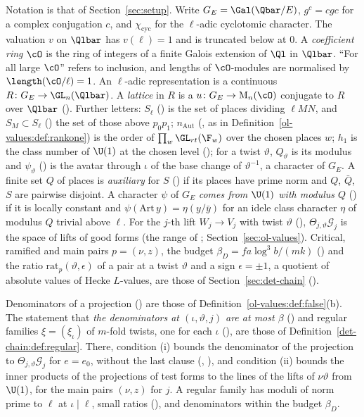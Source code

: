 Notation is that of Section~\ref{sec:setup}. Write $G_E=\Gal(\Qbar/E)$, $g^c=cgc$ for a complex
conjugation $c$, and $\chi_{\mathrm{cyc}}$ for the $\ell$-adic cyclotomic character. The valuation $v$ on $\Qlbar$
has $v(\ell)=1$ and is truncated below at $0$. A \emph{coefficient ring} $\cO$ is the ring of integers
of a finite Galois extension of $\Ql$ in $\Qlbar$. ``For all large $\cO$'' refers to inclusion, and
lengths of $\cO$-modules are normalised by $\length(\cO/\ell)=1$. An $\ell$-adic representation is a
continuous $R\colon G_E\to\GL_n(\Qlbar)$. A \emph{lattice} in $R$ is a $u\colon G_E\to\mathrm M_n(\cO)$
conjugate to $R$ over $\Qlbar$ (). Further letters: $S_\ell$
() is the set of places dividing $\ell MN$, and $S_M\subset S_\ell$
() the set of those above $p_0p_1$; $n_{\mathrm{Aut}}$
(, as in Definition~\ref{ol-values:def:rankone}) is the order of
$\prod_w\GL_{rt}(\F_w)$ over the chosen places $w$; $h_1$ is the class number of $\U(1)$ at the chosen level
(); for a twist $\vartheta$, $Q_\vartheta$ is its modulus and $\psi_\vartheta$
() is the avatar through $\iota$ of the base change of
$\vartheta^{-1}$, a character of $G_E$. A finite set $Q$ of places is \emph{auxiliary} for $S$ () if its places have
prime norm and $Q$, $\bar Q$, $S$ are pairwise disjoint. A character $\psi$ of $G_E$ \emph{comes from
$\U(1)$ with modulus $Q$} () if it is locally constant and
$\psi(\mathrm{Art}\,y)=\eta(y/\bar y)$ for an idele class character $\eta$ of modulus $Q$ trivial
above $\ell$. For the $j$-th lift $W_j\to V_j$ with twist $\vartheta$ (),
$\Theta_{j,\vartheta}\mathcal G_j$ is the space of lifts of good forms (the range of
; Section~\ref{sec:ol-values}). Critical, ramified and main
pairs $p=(\nu,z)$, the budget $\beta_D=f a\log^3b/(mk)$ () and the
ratio $\mathrm{rat}_p(\vartheta,\epsilon)$ of a pair at a twist $\vartheta$ and a sign $\epsilon=\pm1$,
a quotient of absolute values of Hecke $L$-values, are those of Section~\ref{sec:det-chain}
().

Denominators of a projection () are those of
Definition~\ref{ol-values:def:false}(b). The statement that \emph{the denominators at
$(\iota,\vartheta,j)$ are at most $\beta$} () and regular families
$\xi=(\xi_\iota)$ of $m$-fold twists, one for each $\iota$ (), are
those of Definition~\ref{det-chain:def:regular}. There, condition (i) bounds the denominator of the
projection to $\Theta_{j,\vartheta}\mathcal G_j$ for $e=e_0$, without the last clause
(, ), and condition
(ii) bounds the inner products of the projections of test forms to the lines of the lifts of
$\nu\vartheta$ from $\U(1)$, for the main pairs $(\nu,z)$ for $j$. A regular family has moduli of norm
prime to $\ell$ at $\iota\mid\ell$, small ratios (), and denominators
within the budget $\beta_D$.

